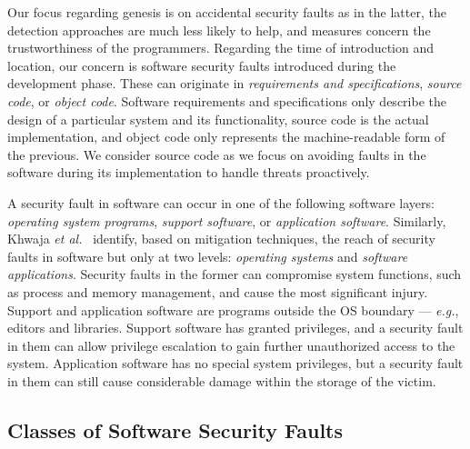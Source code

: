 Our focus regarding genesis is on accidental security faults as in the latter, the detection approaches are much less likely to help, and measures concern the trustworthiness of the programmers. Regarding the time of introduction and location, our concern is software security faults introduced during the development phase. These can originate in \textit{requirements and specifications}, \textit{source code}, or \textit{object code}. Software requirements and specifications only describe the design of a particular system and its functionality, source code is the actual implementation, and object code only represents the machine-readable form of the previous. We consider source code as we focus on avoiding faults in the software during its implementation to handle threats proactively.

A security fault in software can occur in one of the following software layers: \textit{operating system programs}, \textit{support software}, or \textit{application software}. Similarly, Khwaja \textit{et al.}~\cite{Khwaja2020ASF} identify, based on mitigation techniques, the reach of security faults in software but only at two levels: \textit{operating systems} and \textit{software applications}. Security faults in the former can compromise system functions, such as process and memory management, and cause the most significant injury. Support and application software are programs outside the \ac{OS} boundary — \textit{e.g.}, editors and libraries. Support software has granted privileges, and a security fault in them can allow privilege escalation to gain further unauthorized access to the system. Application software has no special system privileges, but a security fault in them can still cause considerable damage within the storage of the victim. 

\subsection{Classes of Software Security Faults}
